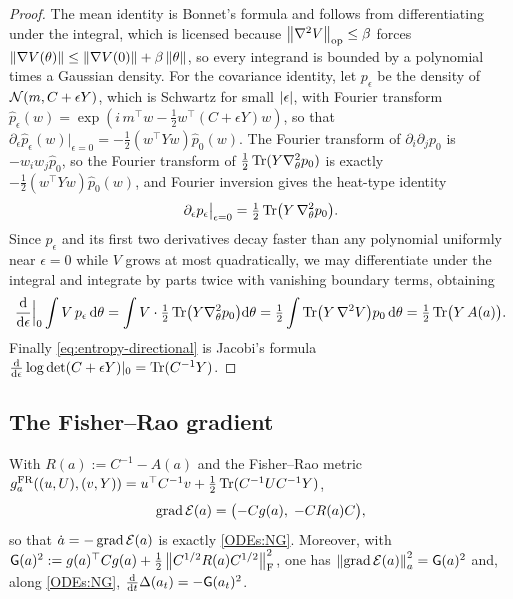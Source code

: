 \begin{proof}
The mean identity is Bonnet's formula and follows from differentiating under the integral, which
is licensed because $\left\lVert \nabla^2V\right\rVert_{\mathrm{op}}\leq\beta$ forces
$\left\lVert \nabla V(\theta)\right\rVert\leq\left\lVert \nabla V(0)\right\rVert+\beta\left\lVert \theta\right\rVert$, so every integrand is bounded
by a polynomial times a Gaussian density. For the covariance identity, let $p_\epsilon$ be the
density of $\mathcal{N}(m,C+\epsilon Y)$, which is Schwartz for small $\left\lvert \epsilon\right\rvert$, with Fourier
transform $\widehat p_\epsilon(w)=\exp(i\,m^\top w-\tfrac12w^\top(C+\epsilon Y)w)$,
so that
$\partial_\epsilon\widehat p_\epsilon(w)|_{\epsilon=0}=-\tfrac12(w^\top Yw)\widehat p_0(w)$.
The Fourier transform of $\partial_i\partial_jp_0$ is $-w_iw_j\widehat p_0$, so the
Fourier transform of $\tfrac12\operatorname{Tr}(Y\nabla_\theta^2p_0)$ is exactly
$-\tfrac12(w^\top Yw)\widehat p_0(w)$, and Fourier inversion gives the heat-type
identity
\begin{equation}
\label{eq:heat-identity}
    \partial_\epsilon p_\epsilon\big|_{\epsilon=0}=\tfrac12\operatorname{Tr}\bigl(Y\,\nabla_\theta^2p_0\bigr).
\end{equation}
Since $p_\epsilon$ and its first two derivatives decay faster than any polynomial uniformly
near $\epsilon=0$ while $V$ grows at most quadratically, we may differentiate under the
integral and integrate by parts twice with vanishing boundary terms, obtaining
\[
    \frac{\mathrm{d}}{\mathrm{d}\epsilon}\Big|_0\int V\,p_\epsilon\,\mathrm{d}\theta
    =\int V\cdot\tfrac12\operatorname{Tr}\bigl(Y\nabla_\theta^2p_0\bigr)\mathrm{d}\theta
    =\tfrac12\int\operatorname{Tr}\bigl(Y\,\nabla^2V\bigr)p_0\,\mathrm{d}\theta
    =\tfrac12\operatorname{Tr}\bigl(Y\,A(a)\bigr).
\]
Finally \eqref{eq:entropy-directional} is Jacobi's formula
$\tfrac{\mathrm{d}}{\mathrm{d}\epsilon}\log\det(C+\epsilon Y)|_0=\operatorname{Tr}(C^{-1}Y)$.
\end{proof}

\subsection{The Fisher--Rao gradient}

\begin{lemma}
\label{lem:FR-grad-app}
With $R(a):=C^{-1}-A(a)$ and the Fisher--Rao metric
$g_a^{\mathrm{FR}}((u,U),(v,Y))=u^\top C^{-1}v+\tfrac12\operatorname{Tr}(C^{-1}UC^{-1}Y)$,
\begin{equation}
\label{eq:FR-grad}
    \operatorname{grad}\mathcal{E}(a)=\bigl(-Cg(a),\;-CR(a)C\bigr),
\end{equation}
so that $\dot a=-\operatorname{grad}\mathcal{E}(a)$ is exactly \eqref{ODEs:NG}. Moreover, with
$\mathsf{G}(a)^2:=g(a)^\top Cg(a)+\tfrac12\left\lVert C^{1/2}R(a)C^{1/2}\right\rVert_{\mathrm{F}}^2$, one has
$\left\lVert \operatorname{grad}\mathcal{E}(a)\right\rVert_a^2=\mathsf{G}(a)^2$ and, along \eqref{ODEs:NG},
$\tfrac{\mathrm{d}}{\mathrm{d} t}\Delta(a_t)=-\mathsf{G}(a_t)^2$.
\end{lemma}

